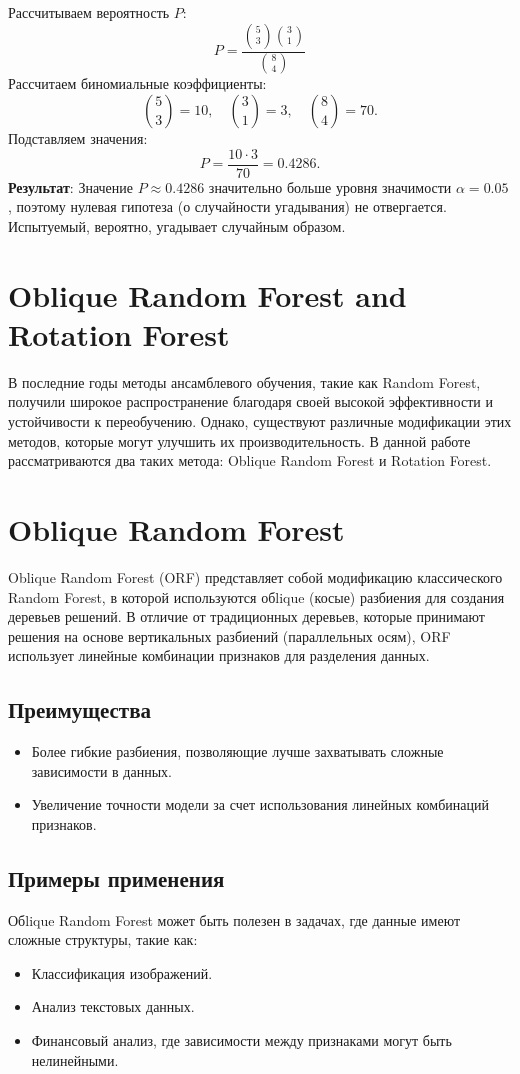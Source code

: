 Рассчитываем вероятность $P$:
\[
    P = \frac{\binom{5}{3} \binom{3}{1}}{\binom{8}{4}}
\]
Рассчитаем биномиальные коэффициенты:
\[
    \binom{5}{3} = 10, \quad \binom{3}{1} = 3, \quad \binom{8}{4} = 70.
\]
Подставляем значения:
\[
    P = \frac{10 \cdot 3}{70} = 0.4286.
\]
\textbf{Результат}: Значение $P \approx 0.4286$ значительно больше уровня значимости $\alpha = 0.05$, поэтому нулевая гипотеза (о случайности угадывания) не отвергается. Испытуемый, вероятно, угадывает случайным образом.

\section{Oblique Random Forest and Rotation Forest}
В последние годы методы ансамблевого обучения, такие как Random Forest, получили широкое распространение благодаря своей высокой эффективности и устойчивости к переобучению. Однако, существуют различные модификации этих методов, которые могут улучшить их производительность. В данной работе рассматриваются два таких метода: Oblique Random Forest и Rotation Forest.

\section{Oblique Random Forest}
Oblique Random Forest (ORF) представляет собой модификацию классического Random Forest, в которой используются обlique (косые) разбиения для создания деревьев решений. В отличие от традиционных деревьев, которые принимают решения на основе вертикальных разбиений (параллельных осям), ORF использует линейные комбинации признаков для разделения данных.

\subsection{Преимущества}
\begin{itemize}
    \item Более гибкие разбиения, позволяющие лучше захватывать сложные зависимости в данных.
    \item Увеличение точности модели за счет использования линейных комбинаций признаков.
\end{itemize}

\subsection{Примеры применения}
Обlique Random Forest может быть полезен в задачах, где данные имеют сложные структуры, такие как:
\begin{itemize}
    \item Классификация изображений.
    \item Анализ текстовых данных.
    \item Финансовый анализ, где зависимости между признаками могут быть нелинейными.
\end{itemize}

